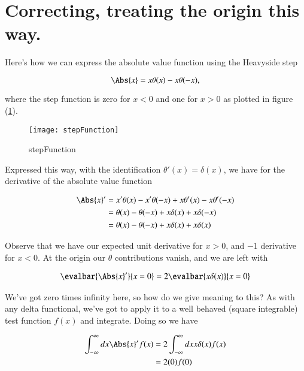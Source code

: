 \section{Correcting, treating the origin this way.}

Here's how we can express the absolute value function using the Heavyside step

\begin{equation}\label{eqn:variationHarmonicOscillator:330}
\Abs{x} = x \theta(x) - x \theta(-x),
\end{equation}

where the step function is zero for $x < 0$ and one for $x > 0$ as plotted in figure (\ref{fig:variationHarmonicOscillator:stepFunction}).

\begin{figure}[htp]
\centering
\texttt{[image: stepFunction]}
\caption{stepFunction}\label{fig:variationHarmonicOscillator:stepFunction}
\end{figure}

Expressed this way, with the identification $\theta'(x) = \delta(x)$, we have for the derivative of the absolute value function

\begin{align*}
\Abs{x}' 
&= x' \theta(x) - x' \theta(-x) + x \theta'(x) - x \theta'(-x) \\
&= \theta(x) - \theta(-x) + x \delta(x) + x \delta(-x) \\
&= \theta(x) - \theta(-x) + x \delta(x) + x \delta(x) \\
\end{align*}

Observe that we have our expected unit derivative for $x > 0$, and $-1$ derivative for $x < 0$.  At the origin our $\theta$ contributions vanish, and we are left with

\begin{align*}
\evalbar{\Abs{x}' }{x=0}
= 2 \evalbar{x \delta(x)}{x=0} \\
\end{align*}

We've got zero times infinity here, so how do we give meaning to this?  As with any delta functional, we've got to apply it to a well behaved (square integrable) test function $f(x)$ and integrate.  Doing so we have

\begin{align*}
\int_{-\infty}^\infty dx \Abs{x}' f(x) 
&= 2 \int_{-\infty}^\infty dx x \delta(x) f(x) \\
&= 2 (0) f(0)
\end{align*}


